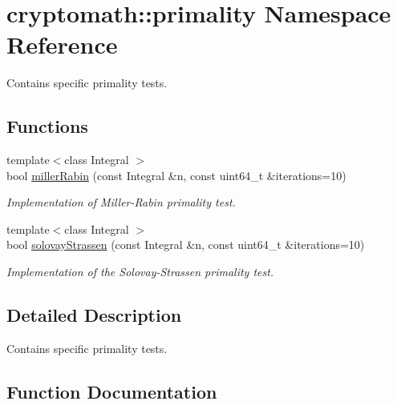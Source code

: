 \hypertarget{namespacecryptomath_1_1primality}{}\section{cryptomath\+:\+:primality Namespace Reference}
\label{namespacecryptomath_1_1primality}


Contains specific primality tests.  


\subsection*{Functions}
\begin{DoxyCompactItemize}
\item 
{\footnotesize template$<$class Integral $>$ }\\bool \hyperlink{namespacecryptomath_1_1primality_ae03b6e47f6d34221e644f6ebdb0fb13a}{miller\+Rabin} (const Integral \&n, const uint64\+\_\+t \&iterations=10)
\begin{DoxyCompactList}\small\item\em Implementation of Miller-\/\+Rabin primality test. \end{DoxyCompactList}\item 
{\footnotesize template$<$class Integral $>$ }\\bool \hyperlink{namespacecryptomath_1_1primality_a533dcc14534b531442954ee32afb2b56}{solovay\+Strassen} (const Integral \&n, const uint64\+\_\+t \&iterations=10)
\begin{DoxyCompactList}\small\item\em Implementation of the Solovay-\/\+Strassen primality test. \end{DoxyCompactList}\end{DoxyCompactItemize}


\subsection{Detailed Description}
Contains specific primality tests. 

\subsection{Function Documentation}
